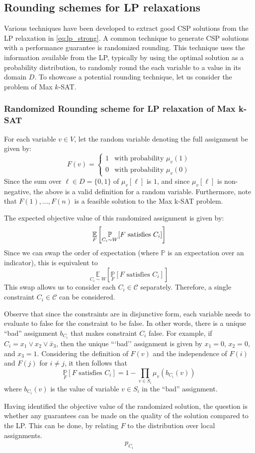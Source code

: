 \subsection{Rounding schemes for LP relaxations}
Various techniques have been developed to extract good CSP solutions from the LP relaxation in \eqref{eq:lp_strong}.
A common technique to generate CSP solutions with a performance guarantee is randomized rounding.
This technique uses the information available from the LP, typically by using the optimal solution as a probability distribution, to randomly round the each variable to a value in its domain $D$.
To showcase a potential rounding technique, let us consider the problem of Max $k$-SAT.

\subsubsection{Randomized Rounding scheme for LP relaxation of Max k-SAT}
For each variable $v \in V$, let the random variable denoting the full assignment be given by:
\[
	F(v) = \begin{cases}
	1 & \text{with probability } \mu_v(1)\\
	0 & \text{with probability } \mu_v(0)
	\end{cases}
\]
Since the sum over $\ell \in D = \{0,1\}$ of  $\mu_v[\ell]$ is $1$, and since $\mu_v[\ell]$ is non-negative, the above is a valid definition for a random variable. 
Furthermore, note that $F(1), \dots, F(n)$ is a feasible solution to the Max k-SAT problem.

The expected objective value of this randomized assignment is given by:
\[
	\underset{F}{\mathbb{E}}\left[ \underset{C_i \sim W}{\mathbb{P}}[ F \text{ satisfies } C_i] \right]
\]
Since we can swap the order of expectation (where $\mathbb{P}$ is an expectation over an indicator), this is equivalent to
\[
\underset{C_i \sim W}{\mathbb{E}}\left[ \underset{F}{\mathbb{P}}[ F \text{ satisfies } C_i] \right]
\]
This swap allows us to consider each $C_i \in \mathcal{C}$ separately. 
Therefore, a single constraint $C_i \in \mathcal{C}$ can be considered.

Observe that since the constraints are in disjunctive form, each variable needs to evaluate to false for the constraint to be false. 
In other words, there is a unique ``bad'' assignment $b_{C_i}$ that makes constraint $C_i$ false. 
For example, if $C_i = x_1 \vee x_2 \vee \bar{x}_3$, then the unique ```bad'' assignment is given by $x_1 = 0$, $x_2 = 0$, and $x_3 = 1$. 
Considering the definition of $F(v)$ and the independence of $F(i)$ and $F(j)$ for $i \neq j$, it then follows that 
\[
	\underset{F}{\mathbb{P}}[ F \text{ satisfies } C_i] = 1 - \prod_{v \in S_i} \mu_v(b_{C_i}(v))
\]
where $b_{C_i}(v)$ is the value of variable $v \in S_i$ in the ``bad'' assignment.

Having identified the objective value of the randomized solution, the question is whether any guarantees can be made on the quality of the solution compared to the LP. This can be done, by relating $F$ to the distribution over local assignments.
\begin{align*}
	p_{C_i}
\end{align*}
